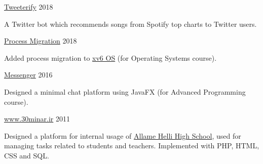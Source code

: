 

\begin{cvprojects}

  \cvproject
    {\href{https://github.com/Erfaniaa/Tweeterify}{Tweeterify}} %
    {} %
    {} %
    {2018} %
    {
      \begin{cvitems} %
        \item {A Twitter bot which recommends songs from Spotify top charts to Twitter users.}
      \end{cvitems}
    }

  \cvproject
    {\href{https://github.com/Erfaniaa/xv6-os}{Process Migration}} %
    {} %
    {} %
    {2018} %
    {
      \begin{cvitems} %
        \item {Added process migration to \href{https://github.com/mit-pdos/xv6-public}{xv6 OS} (for Operating Systems course).}
      \end{cvitems}
    }

  \cvproject
    {\href{https://github.com/Erfaniaa/AP-Messenger}{Messenger}} %
    {} %
    {} %
    {2016} %
    {
      \begin{cvitems} %
        \item {Designed a minimal chat platform using JavaFX (for Advanced Programming course).}
      \end{cvitems}
    }



  \cvproject
    {\href{https://github.com/Erfaniaa/30minar}{www.30minar.ir}} %
    {} %
    {} %
    {2011} %
    {
      \begin{cvitems} %
        \item {Designed a platform for internal usage of \href{https://www.helli.ir/}{Allame Helli High School}, used for managing tasks related to students and teachers. Implemented with PHP, HTML, CSS and SQL.}
      \end{cvitems}
    }


\end{cvprojects}

